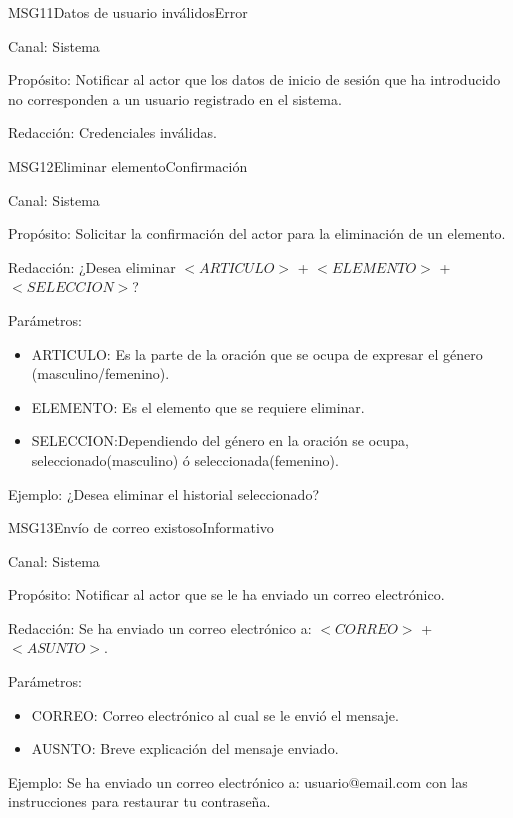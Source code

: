 \begin{mensaje}{MSG11}{Datos de usuario inválidos}{Error}
	\item[Canal:] Sistema
	\item[Propósito:] Notificar al actor que los datos de inicio de sesión que ha introducido no corresponden a un usuario registrado en el sistema.
	\item[Redacción:] Credenciales inválidas.
\end{mensaje}

\begin{mensaje}{MSG12}{Eliminar elemento}{Confirmación}
	\item[Canal:] Sistema
	\item[Propósito:] Solicitar la confirmación del actor para la eliminación de un elemento.
	\item[Redacción:] ¿Desea eliminar $<ARTICULO>$ + $<ELEMENTO>$ + $<SELECCION>$?
	\item[Parámetros:] \cdtEmpty
	\begin{itemize}
		\item ARTICULO: Es la parte de la oración que se ocupa de expresar el género (masculino/femenino).
		\item ELEMENTO: Es el elemento que se requiere eliminar.
		\item SELECCION:Dependiendo del género en la oración se ocupa, seleccionado(masculino)  ó seleccionada(femenino).
	\end{itemize}
	\item[Ejemplo:] ¿Desea eliminar el historial seleccionado?
\end{mensaje}

\begin{mensaje}{MSG13}{Envío de correo existoso}{Informativo}
	\item[Canal:] Sistema
	\item[Propósito:] Notificar al actor que se le ha enviado un correo electrónico.
	\item[Redacción:] Se ha enviado un correo electrónico a: $<CORREO>$ + $<ASUNTO>$.
	\item[Parámetros:] \cdtEmpty
	\begin{itemize}
		\item CORREO: Correo electrónico al cual se le envió el mensaje.
		\item AUSNTO: Breve explicación del mensaje enviado.
	\end{itemize}
	\item[Ejemplo:] Se ha enviado un correo electrónico a: usuario@email.com con las instrucciones para restaurar tu contraseña.
\end{mensaje}

